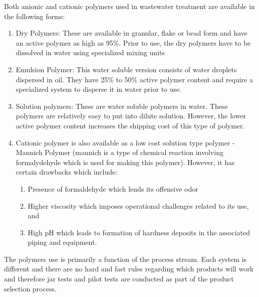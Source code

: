 \vspace{0.6cm}
Both anionic and cationic polymers used in wastewater treatment are available in the following forms: 
\begin{enumerate}
\item Dry Polymers:  These are available in granular, flake or bead form and have an active polymer as high as 95\%.  Prior to use, the dry polymers have to be dissolved in water using specialized mixing units 
\item Emulsion Polymer:  This water soluble version consists of water droplets dispersed in oil.  They have 25\% to 50\% active polymer content and require a specialized system to disperse it in water prior to use.
\item Solution polymers:  These are water soluble polymers in water. These polymers are relatively easy to put into dilute solution.  However, the lower active polymer content increases the shipping cost of this type of polymer.
\item Cationic polymer is also available as a low cost solution type polymer - Mannich Polymer (mannich is a type of chemical reaction involving formalydehyde which is used for making this polymer).  However, it has certain drawbacks which include: 
\begin{enumerate}
\item Presence of formaldehyde which lends its offensive odor
\item Higher viscosity which imposes operational challenges related to its use, and
\item High pH which leads to formation of hardness deposits in the associated piping and equipment.
\end{enumerate}
\end{enumerate}

The polymers use is primarily a function of the process stream.  Each system is different and there are no hard and fast rules regarding which products will work and therefore jar tests and pilot tests are conducted as part of the product selection process.\\




\newpage
